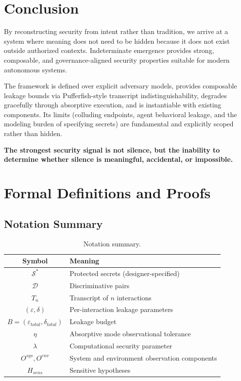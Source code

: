 \documentclass[11pt,a4paper]{article}
\begin{document}
\section{Conclusion}

By reconstructing security from intent rather than tradition, we arrive at a system where meaning does not need to be hidden because it does not exist outside authorized contexts. Indeterminate emergence provides strong, composable, and governance-aligned security properties suitable for modern autonomous systems.

The framework is defined over explicit adversary models, provides composable leakage bounds via Pufferfish-style transcript indistinguishability, degrades gracefully through absorptive execution, and is instantiable with existing components. Its limits (colluding endpoints, agent behavioral leakage, and the modeling burden of specifying secrets) are fundamental and explicitly scoped rather than hidden.

\bigskip

\noindent\textbf{The strongest security signal is not silence, but the inability to determine whether silence is meaningful, accidental, or impossible.}

\appendix

\section{Formal Definitions and Proofs}

\subsection{Notation Summary}

\begin{table}[h]
\centering
\begin{tabular}{@{}cl@{}}
\toprule
\textbf{Symbol} & \textbf{Meaning} \\
\midrule
$\mathcal{S}^*$ & Protected secrets (designer-specified) \\
$\mathcal{D}$ & Discriminative pairs \\
$T_n$ & Transcript of $n$ interactions \\
$(\varepsilon, \delta)$ & Per-interaction leakage parameters \\
$B = (\varepsilon_{total}, \delta_{total})$ & Leakage budget \\
$\eta$ & Absorptive mode observational tolerance \\
$\lambda$ & Computational security parameter \\
$O^{sys}, O^{env}$ & System and environment observation components \\
$H_{sens}$ & Sensitive hypotheses \\
\bottomrule
\end{tabular}
\caption{Notation summary.}
\label{tab:notation}
\end{table}
\end{document}
